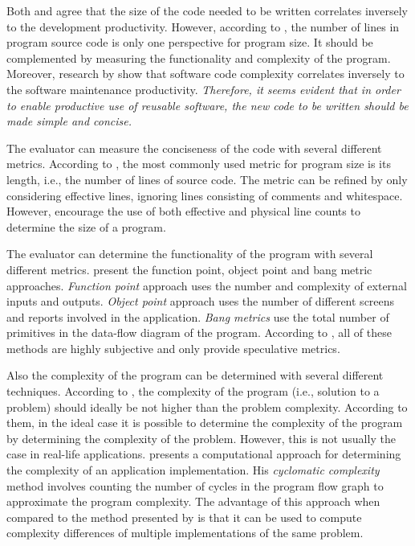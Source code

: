 Both \citet{frakes_software_1996} and \citet{mohagheghi_quality_2007} agree that the size of the code needed to be written correlates inversely to the development productivity. However, according to \citet{fenton_software_1998}, the number of lines in program source code is only one perspective for program size. It should be complemented by measuring the functionality and complexity of the program. Moreover, research by \citet{banker_software_1993,gill_cyclomatic_1991} show that software code complexity correlates inversely to the software maintenance productivity. \emph{Therefore, it seems evident that in order to enable productive use of reusable software, the new code to be written should be made simple and concise.}

The evaluator can measure the conciseness of the code with several different metrics. According to \citet{fenton_software_1998}, the most commonly used metric for program size is its length, i.e., the number of lines of source code. The metric can be refined by only considering effective lines, ignoring lines consisting of comments and whitespace. However, \citet{fenton_software_1998} encourage the use of both effective and physical line counts to determine the size of a program.

The evaluator can determine the functionality of the program with several different metrics. \citet{fenton_software_1998} present the function point, object point and bang metric approaches. \emph{Function point} approach uses the number and complexity of external inputs and outputs. \emph{Object point} approach uses the number of different screens and reports involved in the application. \emph{Bang metrics} use the total number of primitives in the data-flow diagram of the program. According to \citeauthor{fenton_software_1998}, all of these methods are highly subjective and only provide speculative metrics.

Also the complexity of the program can be determined with several different techniques. According to \citet{fenton_software_1998}, the complexity of the program (i.e., solution to a problem) should ideally be not higher than the problem complexity. According to them, in the ideal case it is possible to determine the complexity of the program by determining the complexity of the problem. However, this is not usually the case in real-life applications. \citet{mccabe_complexity_1976} presents a computational approach for determining the complexity of an application implementation. His \emph{cyclomatic complexity} method involves counting the number of cycles in the program flow graph to approximate the program complexity. The advantage of this approach when compared to the method presented by \citet{fenton_software_1998} is that it can be used to compute complexity differences of multiple implementations of the same problem.

